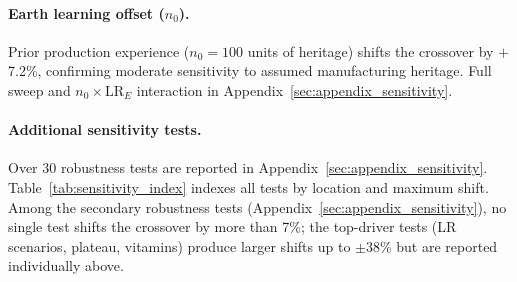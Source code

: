 \documentclass[preprint,12pt]{elsarticle}
\begin{document}
\paragraph{Earth learning offset ($n_0$).} Prior production experience ($n_0 = 100$ units of heritage) shifts the crossover by $+$7.2\%, confirming moderate sensitivity to assumed manufacturing heritage. Full sweep and $n_0 \times \mathrm{LR}_E$ interaction in Appendix~\ref{sec:appendix_sensitivity}.

\paragraph{Additional sensitivity tests.} Over 30 robustness tests are reported in Appendix~\ref{sec:appendix_sensitivity}. Table~\ref{tab:sensitivity_index} indexes all tests by location and maximum shift. Among the secondary robustness tests (Appendix~\ref{sec:appendix_sensitivity}), no single test shifts the crossover by more than 7\%; the top-driver tests (LR scenarios, plateau, vitamins) produce larger shifts up to $\pm$38\% but are reported individually above.
\end{document}
